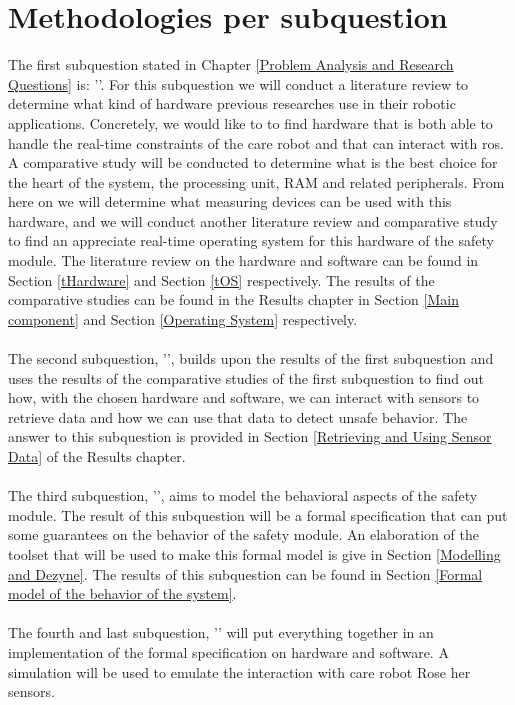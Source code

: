 \documentclass[12pt]{scrreprt}
\begin{document}
\section{Methodologies per subquestion}
\label{Methodologies per subquestion}
The first subquestion stated in Chapter \ref{Problem Analysis and Research Questions} is: '\sqone'. For this subquestion we will conduct a literature review to determine what kind of hardware previous researches use in their robotic applications. Concretely, we would like to to find hardware that is both able to handle the real-time constraints of the care robot and that can interact with \acrshort{ros}. A comparative study will be conducted to determine what is the best choice for the heart of the system, the processing unit, RAM and related peripherals. From here on we will determine what measuring devices can be used with this hardware, and we will conduct another literature review and comparative study to find an appreciate real-time operating system for this hardware of the safety module. The literature review on the hardware and software can be found in Section \ref{tHardware} and Section \ref{tOS} respectively. The results of the comparative studies can be found in the Results chapter in Section \ref{Main component} and Section \ref{Operating System} respectively.
\\\\
The second subquestion, '\sqtwo', builds upon the results of the first subquestion and uses the results of the comparative studies of the first subquestion to find out how, with the chosen hardware and software, we can interact with sensors to retrieve data and how we can use that data to detect unsafe behavior. The answer to this subquestion is provided in Section \ref{Retrieving and Using Sensor Data} of the Results chapter.
\\\\
The third subquestion, '\sqthree', aims to model the behavioral aspects of the safety module. The result of this subquestion will be a formal specification that can put some guarantees on the behavior of the safety module. An elaboration of the toolset that will be used to make this formal model is give in Section \ref{Modelling and Dezyne}. The results of this subquestion can be found in Section \ref{Formal model of the behavior of the system}.
\\\\
The fourth and last subquestion, '\sqfour' will put everything together in an implementation of the formal specification on hardware and software. A simulation will be used to emulate the interaction with care robot Rose her sensors.
\end{document}
